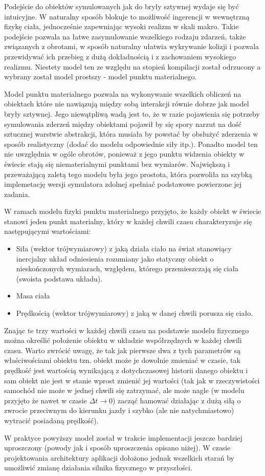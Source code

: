 \par{
Podejście do obiektów symulowanych jak do bryły sztywnej wydaje się być intuicyjne. W naturalny sposób blokuje to możliwość ingerencji w wewnętrzną fizykę ciała, jednocześnie zapewniając wysoki realizm w skali makro.
Takie podejście pozwala na łatwe zasymulowanie wszelkiego rodzaju zdarzeń, także związanych z obrotami, w sposób naturalny ułatwia wykrywanie kolizji i pozwala przewidywać ich przebieg z dużą dokładnością i z zachowaniem wysokiego realizmu.
Niestety model ten ze względu na stopień kompilacji został odrzucony a wybrany został model prostszy - model punktu materialnego.
\par{
Model punktu materialnego pozwala na wykonywanie wszelkich obliczeń na obiektach które nie nawiązują między sobą interakcji równie dobrze jak model bryły sztywnej. Jego niewątpliwą wadą jest to, że w razie pojawienia się potrzeby symulowania zderzeń między obiektami pojawił by się spory narzut na dość sztucznej warstwie abstrakcji, która musiała by powstać by obsłużyć zderzenia w sposób realistyczny (dodać do modelu odpowiednie siły itp.).
Ponadto model ten nie uwzględnia w ogóle obrotów, ponieważ z jego punktu widzenia obiekty w świecie stają się niematerialnymi punktami bez wymiarów.
Największą i przeważającą zaletą tego modelu była jego prostota, która pozwoliła na szybką implemetację wersji symulatora zdolnej spełniać podstawowe powierzone jej zadania. 
}
\par{
W ramach modelu fizyki punktu materialnego przyjęto, że każdy obiekt w świecie stanowi jeden punkt materialny, który w każdej chwili czasu charakteryzuje się następującymi wartościami:
\begin{itemize}
\item Siła (wektor trójwymiarowy) z jaką działa ciało na świat stanowiący inercjalny układ odniesienia rozumiany jako statyczny obiekt o nieskończonych wymiarach, względem, którego przemieszczają się ciała (swoista podstawa układu).
\item Masa ciała
\item Prędkością (wektor trójwymiarowy) z jaką w danej chwili porusza się ciało.
\end{itemize}
Znając te trzy wartości w każdej chwili czasu na podstawie modelu fizycznego można określić położenie obiektu w układzie współrzędnych w każdej chwili czasu.
Warto zwrócić uwagę, że tak jak pierwsze dwa z tych parametrów są właściwościami obiektu tzn. obiekt może je dowolnie zmieniać w czasie, tak prędkość jest wartością wynikającą z dotychczasowej historii danego obiektu i sam obiekt nie jest w stanie wprost zmienić jej wartości (tak jak w rzeczywistości samochód nie może w jednej chwili się zatrzymać, ale może nagle (w modelu przyjęto że nawet w czasie $\Delta t \longrightarrow 0$) zacząć hamować działając z dużą siłą o zwrocie przeciwnym do kierunku jazdy i szybko (ale nie natychmiastowo) wytracić posiadaną prędkość).
}
\par
{
W praktyce powyższy model został w trakcie implementacji jeszcze bardziej uproszczony (powody jak i sposób uproszczenia opisano niżej). W czasie projektowania architektury aplikacji dołożono jednak wszelkich starań by umożliwić zmianę działania silnika fizycznego w przyszłości.
}

}
